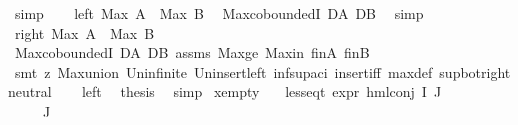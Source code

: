 \begin{isabellebody}
\ simp\isanewline
\ \ \isamarkupfalse%
\ left{\isacharcolon}{\kern0pt}\ {\isachardoublequoteopen}Max\ A\ {\isasymge}\ Max\ B{\isachardoublequoteclose}\ \isamarkupfalse%
\ Max{\isachardot}{\kern0pt}coboundedI\ DA\ DB\ \isamarkupfalse%
\ simp\isanewline
\ \ \isamarkupfalse%
\ right{\isacharcolon}{\kern0pt}\ {\isachardoublequoteopen}Max\ A\ {\isasymle}\ Max\ B{\isachardoublequoteclose}\ \isamarkupfalse%
\ Max{\isachardot}{\kern0pt}coboundedI\ DA\ DB\ assms{\isacharparenleft}{\kern0pt}{}{\isacharparenright}{\kern0pt}\ Max{\isacharunderscore}{\kern0pt}ge\ Max{\isacharunderscore}{\kern0pt}in\ fin{\isacharunderscore}{\kern0pt}A\ fin{\isacharunderscore}{\kern0pt}B\isanewline
\ \ \ \ \isamarkupfalse%
\ {\isacharparenleft}{\kern0pt}smt\ {\isacharparenleft}{\kern0pt}z{}{\isacharparenright}{\kern0pt}\ Max{\isachardot}{\kern0pt}union\ Un{\isacharunderscore}{\kern0pt}infinite\ Un{\isacharunderscore}{\kern0pt}insert{\isacharunderscore}{\kern0pt}left\ inf{\isacharunderscore}{\kern0pt}sup{\isacharunderscore}{\kern0pt}aci{\isacharparenleft}{\kern0pt}{}{\isacharparenright}{\kern0pt}\ insert{\isacharunderscore}{\kern0pt}iff\ max{\isacharunderscore}{\kern0pt}def\ sup{\isacharunderscore}{\kern0pt}bot{\isachardot}{\kern0pt}right{\isacharunderscore}{\kern0pt}neutral{\isacharparenright}{\kern0pt}\isanewline
\ \ \isamarkupfalse%
\ left\ \isamarkupfalse%
\ {\isacharquery}{\kern0pt}thesis\ \isamarkupfalse%
\ simp\isanewline
{}\isamarkupfalse%
%
\endisatagproof
{\isafoldproof}%
%
\isadelimproof
\isanewline
%
\endisadelimproof
\isanewline
{}\isamarkupfalse%
\ x{}{\isacharunderscore}{\kern0pt}empty{\isacharcolon}{\kern0pt}\isanewline
\ \ \ {\isachardoublequoteopen}{\isacharparenleft}{\kern0pt}less{\isacharunderscore}{\kern0pt}eq{\isacharunderscore}{\kern0pt}t\ {\isacharparenleft}{\kern0pt}expr\ {\isacharparenleft}{\kern0pt}hml{\isacharunderscore}{\kern0pt}conj\ I\ J\ {\isasymPhi}{\isacharparenright}{\kern0pt}{\isacharparenright}{\kern0pt}\ {\isacharparenleft}{\kern0pt}{\isasyminfinity}{\isacharcomma}{\kern0pt}\ {\isasyminfinity}{\isacharcomma}{\kern0pt}\ {\isasyminfinity}{\isacharcomma}{\kern0pt}\ {\isasyminfinity}{\isacharcomma}{\kern0pt}\ {}{\isacharcomma}{\kern0pt}\ {}{\isacharparenright}{\kern0pt}{\isacharparenright}{\kern0pt}{\isachardoublequoteclose}\ \isanewline
\ \ \ {\isachardoublequoteopen}{\isacharparenleft}{\kern0pt}{\isasymPhi}\ {\isacharbackquote}{\kern0pt}\ J{\isacharparenright}{\kern0pt}\ {\isacharequal}{\kern0pt}\ {\isacharbraceleft}{\kern0pt}{\isacharbraceright}{\kern0pt}{\isachardoublequoteclose}\isanewline

\end{isabellebody}
